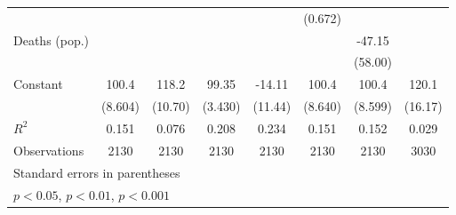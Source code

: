 \documentclass{article}
\begin{document}
{\begin{longtable}{l*{7}{c}}
                &                  &                  &                  &                  &  (0.672)         &                  &                  \\
Deaths (pop.)   &                  &                  &                  &                  &                  &   -47.15         &                  \\
                &                  &                  &                  &                  &                  &  (58.00)         &                  \\
Constant        &    100.4\sym{***}&    118.2\sym{***}&    99.35\sym{***}&   -14.11         &    100.4\sym{***}&    100.4\sym{***}&    120.1\sym{***}\\
                &  (8.604)         &  (10.70)         &  (3.430)         &  (11.44)         &  (8.640)         &  (8.599)         &  (16.17)         \\
\hline
\(R^{2}\)       &    0.151         &    0.076         &    0.208         &    0.234         &    0.151         &    0.152         &    0.029         \\
Observations    &     2130         &     2130         &     2130         &     2130         &     2130         &     2130         &     3030         \\
\hline\hline
\multicolumn{8}{l}{\footnotesize Standard errors in parentheses}\\
\multicolumn{8}{l}{\footnotesize \sym{*} \(p<0.05\), \sym{**} \(p<0.01\), \sym{***} \(p<0.001\)}\\
\end{longtable}
}
\end{document}
